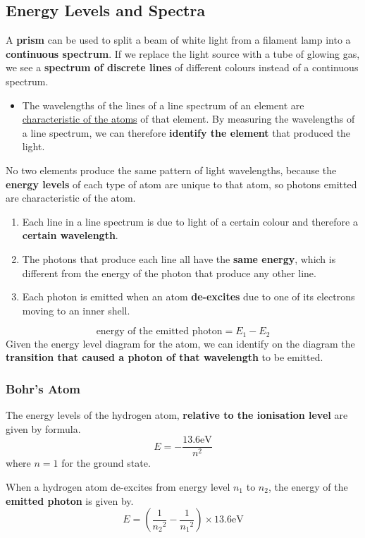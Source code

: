 \subsection{Energy Levels and Spectra}

A \textbf{prism} can be used to split a beam of white light from a filament lamp into a \textbf{continuous spectrum}. If we replace the light source with a tube of glowing gas, we see a \textbf{spectrum of discrete lines} of different colours instead of a continuous spectrum.
\begin{itemize}
    \item The wavelengths of the lines of a line spectrum of an element are \underline{characteristic of the atoms} of that element. By measuring the wavelengths of a line spectrum, we can therefore \textbf{identify the element} that produced the light.
\end{itemize}

No two elements produce the same pattern of light wavelengths, because the \textbf{energy levels} of each type of atom are unique to that atom, so photons emitted are characteristic of the atom.

\begin{enumerate}
    \item Each line in a line spectrum is due to light of a certain colour and therefore a \textbf{certain wavelength}.
    \item The photons that produce each line all have the \textbf{same energy}, which is different from the energy of the photon that produce any other line.
    \item Each photon is emitted when an atom \textbf{de-excites} due to one of its electrons moving to an inner shell.
\end{enumerate}
$$\text{energy of the emitted photon}=E_1-E_2$$
Given the energy level diagram for the atom, we can identify on the diagram the \textbf{transition that caused a photon of that wavelength} to be emitted.

\subsubsection*{Bohr's Atom}

The energy levels of the hydrogen atom, \textbf{relative to the ionisation level} are given by formula.
$$E=-\frac{13.6\text{eV}}{n^2}$$
where $n=1$ for the ground state.

When a hydrogen atom de-excites from energy level $n_1$ to $n_2$, the energy of the \textbf{emitted photon} is given by.
$$E=\left(\frac{1}{{n_2}^2}-\frac{1}{{n_1}^2}\right)\times13.6\text{eV}$$
